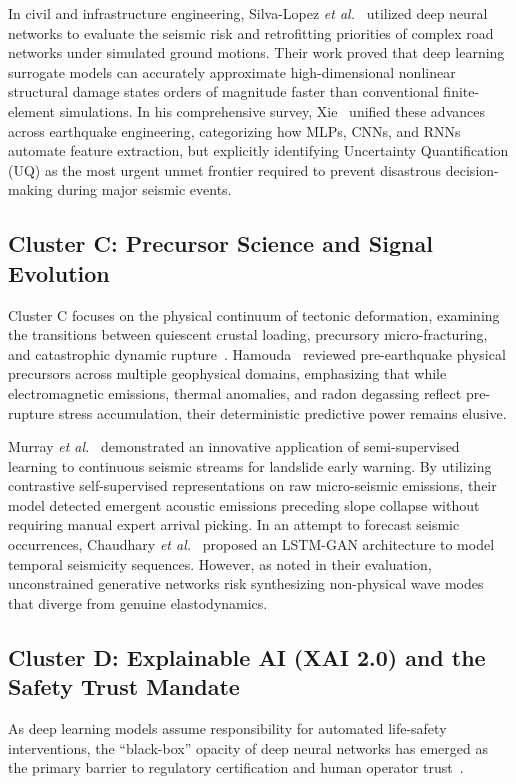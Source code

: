 \documentclass[journal]{IEEEtran}
\begin{document}
In civil and infrastructure engineering, Silva-Lopez \textit{et al.}~\cite{silvalopez2022deep} utilized deep neural networks to evaluate the seismic risk and retrofitting priorities of complex road networks under simulated ground motions. Their work proved that deep learning surrogate models can accurately approximate high-dimensional nonlinear structural damage states orders of magnitude faster than conventional finite-element simulations. In his comprehensive survey, Xie~\cite{xie2024deep} unified these advances across earthquake engineering, categorizing how MLPs, CNNs, and RNNs automate feature extraction, but explicitly identifying Uncertainty Quantification (UQ) as the most urgent unmet frontier required to prevent disastrous decision-making during major seismic events.

\subsection{Cluster C: Precursor Science and Signal Evolution}
Cluster C focuses on the physical continuum of tectonic deformation, examining the transitions between quiescent crustal loading, precursory micro-fracturing, and catastrophic dynamic rupture~\cite{hamouda2025advanced, murray2025characterisation, chaudhary2025innovative}. Hamouda~\cite{hamouda2025advanced} reviewed pre-earthquake physical precursors across multiple geophysical domains, emphasizing that while electromagnetic emissions, thermal anomalies, and radon degassing reflect pre-rupture stress accumulation, their deterministic predictive power remains elusive.

Murray \textit{et al.}~\cite{murray2025characterisation} demonstrated an innovative application of semi-supervised learning to continuous seismic streams for landslide early warning. By utilizing contrastive self-supervised representations on raw micro-seismic emissions, their model detected emergent acoustic emissions preceding slope collapse without requiring manual expert arrival picking. In an attempt to forecast seismic occurrences, Chaudhary \textit{et al.}~\cite{chaudhary2025innovative} proposed an LSTM-GAN architecture to model temporal seismicity sequences. However, as noted in their evaluation, unconstrained generative networks risk synthesizing non-physical wave modes that diverge from genuine elastodynamics.

\subsection{Cluster D: Explainable AI (XAI 2.0) and the Safety Trust Mandate}
As deep learning models assume responsibility for automated life-safety interventions, the ``black-box'' opacity of deep neural networks has emerged as the primary barrier to regulatory certification and human operator trust~\cite{longo2024explainable, chamola2023review, mersha2024explainable}. 
\end{document}
